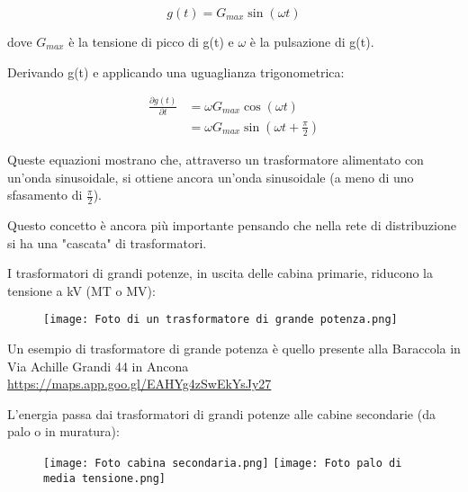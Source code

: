 {
    \Large 
    \begin{equation}
        g(t) = G_{max} \sin(\omega t)
    \end{equation}
}

dove $G_{max}$ è la tensione di picco di g(t) e $\omega$ è la pulsazione di g(t). \newline 

Derivando g(t) e applicando una uguaglianza trigonometrica: 

{
    \Large 
    \begin{equation}
        \begin{split}
            \frac{\partial g(t)}{\partial t}
            &= 
            \omega G_{max} \cos(\omega t)
            \\
            &= 
            \omega G_{max} \sin(\omega t + \frac{\pi}{2})
        \end{split}
    \end{equation}
}

Queste equazioni mostrano che, attraverso un trasformatore alimentato con un'onda sinusoidale, 
si ottiene ancora un'onda sinusoidale (a meno di uno sfasamento di $\frac{\pi}{2}$). \newline 

Questo concetto è ancora più importante pensando che nella rete di distribuzione si ha una "cascata" di trasformatori. \newline 

\newpage 

I trasformatori di grandi potenze, in uscita delle cabina primarie, riducono la tensione a kV (MT o MV): 

\begin{figure}[h]
    \centering
    \texttt{[image: Foto di un trasformatore di grande potenza.png]}
\end{figure}

\begin{tcolorbox}
Un esempio di trasformatore di grande potenza è quello presente alla Baraccola in Via Achille Grandi 44 in Ancona \\
\url{https://maps.app.goo.gl/EAHYg4zSwEkYsJy27}    
\end{tcolorbox}

L'energia passa dai trasformatori di grandi potenze alle cabine secondarie (da palo o in muratura): 

\begin{figure}[h]
    \centering
    \texttt{[image: Foto cabina secondaria.png]}
    \texttt{[image: Foto palo di media tensione.png]}
\end{figure}

